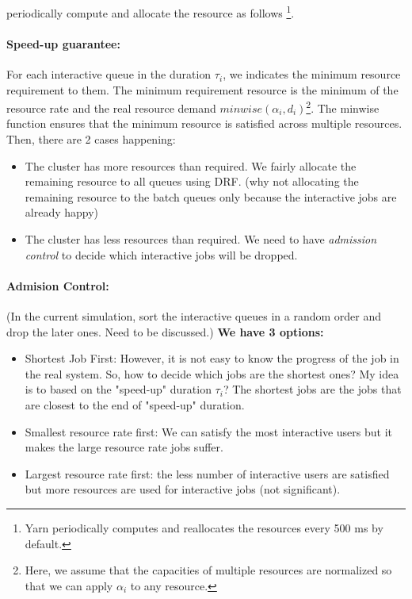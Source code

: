 \name periodically compute and allocate the resource as follows \footnote{Yarn periodically computes and reallocates the resources every 500 ms by default.}.

\paragraph{Speed-up guarantee:} For each interactive queue in the duration $\tau_i$, we indicates the minimum resource requirement to them. The minimum requirement resource is the minimum of the resource rate and the real resource demand $minwise(\alpha_i, d_i)$\footnote{Here, we assume that the capacities of multiple resources are normalized so that we can apply $\alpha_i$ to any resource.}. The minwise function ensures that the minimum resource is satisfied across multiple resources. Then, there are 2 cases happening:

\begin{itemize}
\item The cluster has more resources than required. We fairly allocate the remaining resource to all queues using DRF. (why not allocating the remaining resource to the batch queues only because the interactive jobs are already happy)
\item The cluster has less resources than required. We need to have \textit{admission control} to decide which interactive jobs will be dropped.
\end{itemize}

\paragraph{Admision Control:}  (In the current simulation, sort the interactive queues in a random order and drop the later ones. Need to be discussed.)  \textbf{We have 3 options: }
\begin{itemize}
\item Shortest Job First: However, it is not easy to know the progress of the job in the real system. So, how to decide which jobs are the shortest ones? My idea is to based on the "speed-up" duration $\tau_i$? The shortest jobs are the jobs that are closest to the end of "speed-up" duration.
\item Smallest resource rate first: We can satisfy the most interactive users but it makes the large resource rate jobs suffer.
\item Largest resource rate first: the less number of interactive users are satisfied but more resources are used for interactive jobs (not significant).
\end{itemize}

